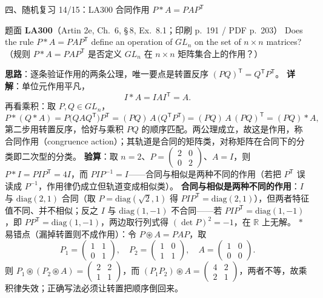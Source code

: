 \documentclass[aspectratio=169,10pt,fontset=none]{ctexbeamer}
\newcommand{\ex}[1]{\textcolor{accent}{\footnotesize\bfseries #1}}
\newcommand{\key}[1]{\textcolor{ink}{\bfseries #1}}
\newcommand{\starpt}{\textcolor{accent}{\bfseries$\ast$}}
\begin{document}
\begin{frame}[t]{四、随机复习 14/15：LA300 合同作用 $P*A=PAP^{\mathsf T}$}
\label{ex:LA300}
\scriptsize
\begin{block}{\footnotesize 题面 \ex{LA300}（Artin 2e, Ch.~6, \S\,8, Ex.~8.1；印刷 p.~191 / PDF p.~203）}
Does the rule $P*A=PAP^{\mathsf T}$ define an operation of $GL_n$ on the set of $n\times n$ matrices?
（规则 $P*A=PAP^{\mathsf T}$ 是否定义 $GL_n$ 在 $n\times n$ 矩阵集合上的作用？）
\end{block}
\key{思路}：逐条验证作用的两条公理，唯一要点是转置反序 $(PQ)^{\mathsf T}=Q^{\mathsf T}P^{\mathsf T}$。
\key{详解}：单位元作用平凡，
\[ I*A=IAI^{\mathsf T}=A. \]
再看乘积：取 $P,Q\in GL_n$，
\[
P*(Q*A)=P\big(QAQ^{\mathsf T}\big)P^{\mathsf T}
=(PQ)\,A\,\big(Q^{\mathsf T}P^{\mathsf T}\big)
=(PQ)\,A\,(PQ)^{\mathsf T}=(PQ)*A,
\]
第二步用转置反序，恰好与乘积 $PQ$ 的顺序匹配。两公理成立，故这是作用，称合同作用（congruence action）；其轨道是合同的矩阵类，对称矩阵在合同下的分类即二次型的分类。
\key{验算}：取 $n=2$、$P=\begin{pmatrix}2&0\\0&2\end{pmatrix}$、$A=I$，则 $P*I=PIP^{\mathsf T}=4I$，而 $PIP^{-1}=I$——合同与相似是两种不同的作用（若把 $P^{\mathsf T}$ 误读成 $P^{-1}$，作用律仍成立但轨道变成相似类）。
\key{合同与相似是两种不同的作用}：$I$ 与 $\mathrm{diag}(2,1)$ 合同（取 $P=\mathrm{diag}(\sqrt2,1)$ 得 $PIP^{\mathsf T}=\mathrm{diag}(2,1)$），但两者特征值不同、并不相似；反之 $I$ 与 $\mathrm{diag}(1,-1)$ 不合同——若 $PIP^{\mathsf T}=\mathrm{diag}(1,-1)$，即 $PP^{\mathsf T}=\mathrm{diag}(1,-1)$，两边取行列式得 $(\det P)^2=-1$，在 $\mathbb R$ 上无解。
\starpt 易错点（漏掉转置则不成作用）：令 $P\circledast A=PAP$，取
\[
P_1=\begin{pmatrix}1&1\\0&1\end{pmatrix},\quad
P_2=\begin{pmatrix}1&0\\1&1\end{pmatrix},\quad
A=\begin{pmatrix}1&0\\0&0\end{pmatrix}.
\]
则 $P_1\circledast(P_2\circledast A)=\begin{pmatrix}2&2\\1&1\end{pmatrix}$，而 $(P_1P_2)\circledast A=\begin{pmatrix}4&2\\2&1\end{pmatrix}$，两者不等，故乘积律失效；正确写法必须让转置把顺序倒回来。
\end{frame}
\end{document}
